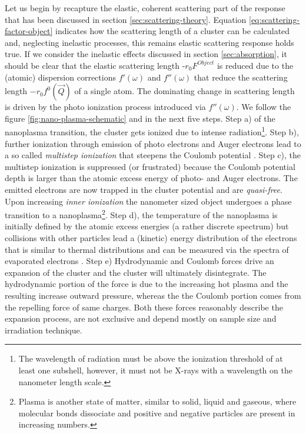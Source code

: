  Let us begin by recapture the elastic, coherent scattering part of the response that has been discussed in section \ref{sec:scattering-theory}. Equation \eqref{eq:scattering-factor-object} indicates how the scattering length of a cluster can be calculated and, neglecting inelastic processes, this remains elastic scattering response holds true. If we consider the inelastic effects discussed in section \ref{sec:absorption}, it should be clear that the elastic scattering length -$r_{0}F^{Object}$ is reduced due to the (atomic) dispersion corrections $f'\left(\omega\right)$ and $f''\left(\omega\right)$ that reduce the scattering length $-r_{0}f^{0}\left(\vec{Q}\right)$ of a single atom. The dominating change in scattering length is driven by the photo ionization process introduced via $f''\left(\omega\right)$. We follow the figure \ref{fig:nano-plasma-schematic} and \citep{Arbeiter-2011-NJP,Bostedt-2010-JPB} in the next five steps. Step a) of the nanoplasma transition, the cluster gets ionized due to intense radiation\footnote{The wavelength of radiation must be above the ionization threshold of at least one subshell, however, it must not be X-rays with a wavelength on the nanometer length scale.}. Step b), further ionization through emission of photo electrons and Auger electrons lead to a so called \textit{multistep ionization} that steepens the Coulomb potential \citep{Wabnitz-2002-Nature,Laarmann-2004-PRL,Bostedt-2008-PRL}. Step c), the multistep ionization is suppressed (or frustrated) because the Coulomb potential depth is larger than the atomic excess energy of photo- and Auger electrons. The emitted electrons are now trapped in the cluster potential and are \textit{quasi-free}. Upon increasing \textit{inner ionization} the nanometer sized object undergoes a phase transition to a nanoplasma\footnote{Plasma is another state of matter, similar to solid, liquid and gaseous, where molecular bonds dissociate and positive and negative particles are present in increasing numbers.}. Step d), the temperature of the nanoplasma is initially defined by the atomic excess energies (a rather discrete spectrum) but collisions with other particles lead a (kinetic) energy distribution of the electrons that is similar to thermal distributions and can be measured via the spectra of evaporated electrons \citep{Laarmann-2005-PRL,Bostedt-2010-NJP}. Step e) Hydrodynamic and Coulomb forces drive an expansion of the cluster and the cluster will ultimately disintegrate. The hydrodynamic portion of the force is due to the increasing hot plasma and the resulting increase outward pressure, whereas the the Coulomb portion comes from the repelling force of same charges. Both these forces reasonably describe the expansion process, are not exclusive and depend mostly on sample size and irradiation technique.\\
